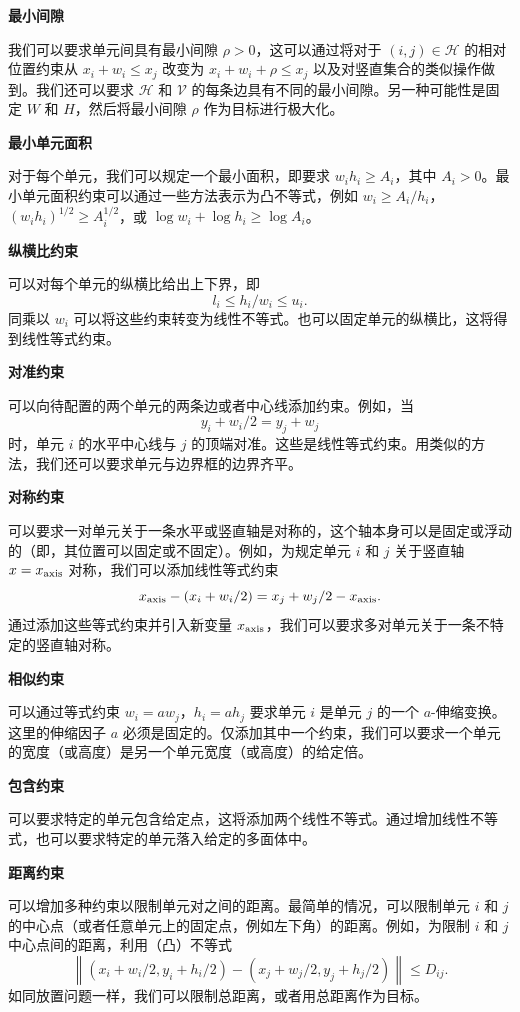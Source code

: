 \documentclass[UTF8,12pt,a4paper,fontset=fandol]{ctexart}
\begin{document}
\noindent\textbf{最小间隙}

我们可以要求单元间具有最小间隙 $\rho>0$，这可以通过将对于 $(i,j)\in\mathcal H$ 的相对位置约束从 $x_i+w_i\leq x_j$ 改变为 $x_i+w_i+\rho\leq x_j$ 以及对竖直集合的类似操作做到。我们还可以要求 $\mathcal H$ 和 $\mathcal V$ 的每条边具有不同的最小间隙。另一种可能性是固定 $W$ 和 $H$，然后将最小间隙 $\rho$ 作为目标进行极大化。

\noindent\textbf{最小单元面积}

对于每个单元，我们可以规定一个最小面积，即要求 $w_ih_i\geq A_i$，其中 $A_i>0$。最小单元面积约束可以通过一些方法表示为凸不等式，例如 $w_i\geq A_i/h_i$，$(w_ih_i)^{1/2}\geq A_i^{1/2}$，或 $\log w_i+\log h_i\geq \log A_i$。

\noindent\textbf{纵横比约束}

可以对每个单元的纵横比给出上下界，即
\[
l_i\leq h_i/w_i\leq u_i.
\]
同乘以 $w_i$ 可以将这些约束转变为线性不等式。也可以固定单元的纵横比，这将得到线性等式约束。

\noindent\textbf{对准约束}

可以向待配置的两个单元的两条边或者中心线添加约束。例如，当
\[
y_i+w_i/2=y_j+w_j
\]
时，单元 $i$ 的水平中心线与 $j$ 的顶端对准。这些是线性等式约束。用类似的方法，我们还可以要求单元与边界框的边界齐平。

\noindent\textbf{对称约束}

可以要求一对单元关于一条水平或竖直轴是对称的，这个轴本身可以是固定或浮动的（即，其位置可以固定或不固定）。例如，为规定单元 $i$ 和 $j$ 关于竖直轴 $x=x_{\rm axis}$ 对称，我们可以添加线性等式约束
\[
x_{\rm axis}-(x_i+w_i/2)=x_j+w_j/2-x_{\rm axis}.
\]
通过添加这些等式约束并引入新变量 $x_{\rm axis}$，我们可以要求多对单元关于一条不特定的竖直轴对称。

\noindent\textbf{相似约束}

可以通过等式约束 $w_i=aw_j$，$h_i=ah_j$ 要求单元 $i$ 是单元 $j$ 的一个 $a$-伸缩变换。这里的伸缩因子 $a$ 必须是固定的。仅添加其中一个约束，我们可以要求一个单元的宽度（或高度）是另一个单元宽度（或高度）的给定倍。

\noindent\textbf{包含约束}

可以要求特定的单元包含给定点，这将添加两个线性不等式。通过增加线性不等式，也可以要求特定的单元落入给定的多面体中。

\noindent\textbf{距离约束}

可以增加多种约束以限制单元对之间的距离。最简单的情况，可以限制单元 $i$ 和 $j$ 的中心点（或者任意单元上的固定点，例如左下角）的距离。例如，为限制 $i$ 和 $j$ 中心点间的距离，利用（凸）不等式
\[
\left\|(x_i+w_i/2,y_i+h_i/2)-(x_j+w_j/2,y_j+h_j/2)\right\|\leq D_{ij}.
\]
如同放置问题一样，我们可以限制总距离，或者用总距离作为目标。
\end{document}
